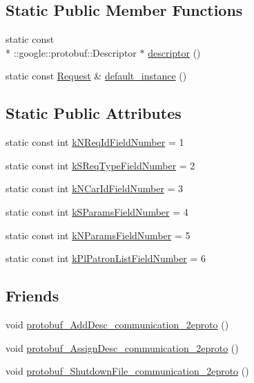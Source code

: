 \subsection*{Static Public Member Functions}
\begin{DoxyCompactItemize}
\item 
static const \\*
\-::google\-::protobuf\-::\-Descriptor $\ast$ \hyperlink{classRequest_a89ffd0d99379c36fed21ef3ead7ee615}{descriptor} ()
\item 
static const \hyperlink{classRequest}{Request} \& \hyperlink{classRequest_af099c13d1b9f6431f78a75b38fa8ed0b}{default\-\_\-instance} ()
\end{DoxyCompactItemize}
\subsection*{Static Public Attributes}
\begin{DoxyCompactItemize}
\item 
static const int \hyperlink{classRequest_a730d2f756f3ebc20ebd2362c3943cbcc}{k\-N\-Req\-Id\-Field\-Number} = 1
\item 
static const int \hyperlink{classRequest_a51c18984ef771a8bb5d313a8b9b352e2}{k\-S\-Req\-Type\-Field\-Number} = 2
\item 
static const int \hyperlink{classRequest_a9d5332b55e0c5b39609a3d102990a798}{k\-N\-Car\-Id\-Field\-Number} = 3
\item 
static const int \hyperlink{classRequest_a831555b68c690fcbe1aecb7027b6c2f1}{k\-S\-Params\-Field\-Number} = 4
\item 
static const int \hyperlink{classRequest_a84ed9597f7700974a6f89ec5dca02381}{k\-N\-Params\-Field\-Number} = 5
\item 
static const int \hyperlink{classRequest_ab5f3c353ffd36fabb93b3e820d643086}{k\-Pl\-Patron\-List\-Field\-Number} = 6
\end{DoxyCompactItemize}
\subsection*{Friends}
\begin{DoxyCompactItemize}
\item 
void \hyperlink{classRequest_ab26f4eb3084d1420c1303a79674a1799}{protobuf\-\_\-\-Add\-Desc\-\_\-communication\-\_\-2eproto} ()
\item 
void \hyperlink{classRequest_a15b53451c705d683df794729c854c3bb}{protobuf\-\_\-\-Assign\-Desc\-\_\-communication\-\_\-2eproto} ()
\item 
void \hyperlink{classRequest_ac41cad024c45b3e4b0ffc5e60c9ecd30}{protobuf\-\_\-\-Shutdown\-File\-\_\-communication\-\_\-2eproto} ()
\end{DoxyCompactItemize}


